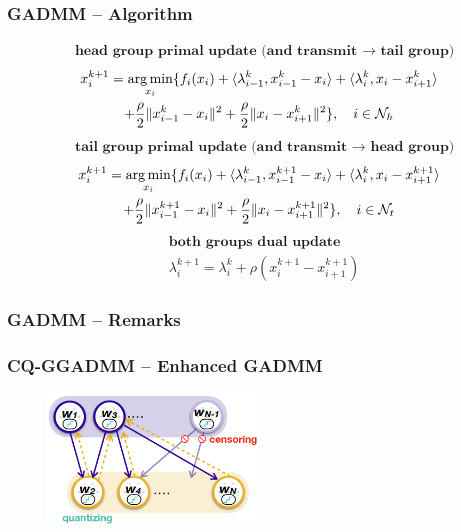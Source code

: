 \begin{frame}
\frametitle{GADMM -- Algorithm}

\begin{fleqn}
\begin{align*}
& \textbf{head group primal update (and transmit $\to$ tail group)}
\end{align*}
\begin{multline*}
    x_i^{k+1} = \operatorname*{arg\,min}\limits_{x_i} \{ f_i(x_i) + \langle \lambda_{i-1}^k, x_{i-1}^k - x_i \rangle + \langle \lambda_{i}^k, x_{i} - x_{i+1}^k \rangle \\
    + \dfrac{\rho}{2}\lVert x_{i-1}^k - x_i \rVert^2 + \dfrac{\rho}{2}\lVert x_{i} - x_{i+1}^k \rVert^2 \}, \quad i \in \mathcal{N}_h
\end{multline*}
\begin{align*}
& \textbf{tail group primal update (and transmit $\to$ head group)}
\end{align*}
\begin{multline*}
    x_i^{k+1} = \operatorname*{arg\,min}\limits_{x_i} \{ f_i(x_i) + \langle \lambda_{i-1}^k, x_{i-1}^{k+1} - x_i \rangle + \langle \lambda_{i}^k, x_{i} - x_{i+1}^{k+1} \rangle \\
    + \dfrac{\rho}{2}\lVert x_{i-1}^{k+1} - x_i \rVert^2 + \dfrac{\rho}{2}\lVert x_{i} - x_{i+1}^{k+1} \rVert^2 \}, \quad i \in \mathcal{N}_t
\end{multline*}
\begin{align*}
& \textbf{both groups dual update} \\
& \lambda_i^{k+1} = \lambda_i^k + \rho (x_i^{k+1} - x_{i+1}^{k+1})
\end{align*}
\end{fleqn}

\end{frame}


\begin{frame}
\frametitle{GADMM -- Remarks}


\end{frame}


\begin{frame}
\frametitle{CQ-GGADMM -- Enhanced GADMM}

\begin{figure}[H]
    \centering
    \includegraphics[width=0.5\textwidth,keepaspectratio]{images/CQ-GGADMM.png}
\end{figure}

\end{frame}

